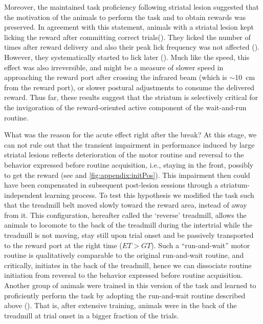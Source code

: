 
Moreover, the maintained task proficiency following striatal lesion suggested that the motivation of the animals to perform the task and to obtain rewards was preserved.
In agreement with this statement, animals with a striatal lesion kept licking the reward after committing correct trials().
They licked the number of times after reward delivery and also their peak lick frequency was not affected ().
However, they systematically started to lick later ().
Much like the speed, this effect was also irreversible, and might be a measure of slower speed in approaching the reward port after crossing the infrared beam (which is $\sim$10~cm from the reward port), or slower postural adjustments to consume the delivered reward.
Thus far, these results suggest that the striatum is selectively critical for the invigoration of the reward-oriented active component of the wait-and-run routine.
\par

What was the reason for the acute effect right after the break?
At this stage, we can not rule out that the transient impairment in performance induced by large striatal lesions reflects deterioration of the motor routine and reversal to the behavior expressed before routine acquisition, i.e., staying in the front, possibly to get the reward (see  and \autoref{fig:appendix:initPos}).
This impairment then could have been compensated in subsequent post-lesion sessions through a striatum-independent learning process.
To test this hypothesis we modified the task such that the treadmill belt moved slowly toward the reward area, instead of away from it.
This configuration, hereafter called the `reverse' treadmill, allows the animals to locomote to the back of the treadmill during the intertrial while the treadmill is not moving, stay still upon trial onset and be passively transported to the reward port at the right time ($ET>GT$).
Such a ``run-and-wait'' motor routine is qualitatively comparable to the original run-and-wait routine, and critically, initiates in the back of the treadmill, hence we can dissociate routine initiation from reversal to the behavior expressed before routine acquisition.
Another group of animals were trained in this version of the task and learned to proficiently perform the task by adopting the run-and-wait routine described above ().
That is, after extensive training, animals were in the back of the treadmill at trial onset in a bigger fraction of the trials. 
